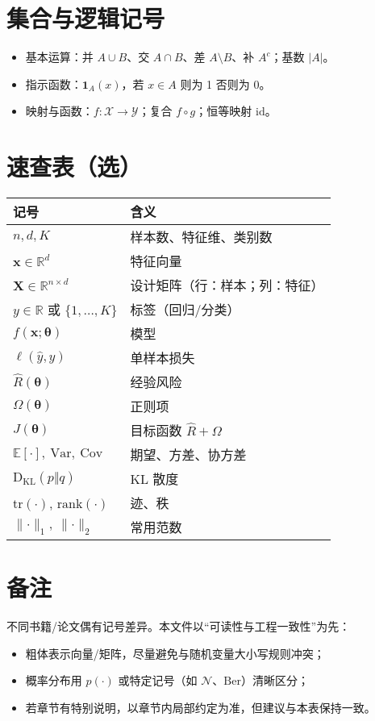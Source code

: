 \documentclass[UTF8,zihao=-4]{ctexart}
\newcommand{\R}{\mathbb{R}}
\newcommand{\E}{\mathbb{E}}
\newcommand{\Var}{\mathrm{Var}}
\newcommand{\Cov}{\mathrm{Cov}}
\newcommand{\KL}{\mathrm{D}_{\mathrm{KL}}}
\newcommand{\tr}{\mathrm{tr}}
\newcommand{\rank}{\mathrm{rank}}
\newcommand{\1}{\mathbf{1}}
\newcommand{\0}{\mathbf{0}}
\begin{document}
\section{集合与逻辑记号}
\begin{itemize}
  \item 基本运算：并 $A\cup B$、交 $A\cap B$、差 $A\setminus B$、补 $A^c$；基数 $|A|$。
  \item 指示函数：$\mathbf{1}_A(x)$，若 $x\in A$ 则为 1 否则为 0。
  \item 映射与函数：$f:\mathcal{X}\to\mathcal{Y}$；复合 $f\circ g$；恒等映射 $\mathrm{id}$。
\end{itemize}

\section{速查表（选）}
\begin{center}
\begin{tabular}{ll}
\hline
记号 & 含义 \\
\hline
$n, d, K$ & 样本数、特征维、类别数 \\
$\bm{x}\in\R^d$ & 特征向量 \\
$\bm{X}\in\R^{n\times d}$ & 设计矩阵（行：样本；列：特征） \\
$y\in\R$ 或 $\{1,\dots,K\}$ & 标签（回归/分类） \\
$f(\bm{x};\bm{\theta})$ & 模型 \\
$\ell(\hat{y},y)$ & 单样本损失 \\
$\hat{R}(\bm{\theta})$ & 经验风险 \\
$\Omega(\bm{\theta})$ & 正则项 \\
$J(\bm{\theta})$ & 目标函数 $\hat{R}+\Omega$ \\
$\E[\cdot],\ \Var,\ \Cov$ & 期望、方差、协方差 \\
$\KL(p\Vert q)$ & KL 散度 \\
$\tr(\cdot)$, $\rank(\cdot)$ & 迹、秩 \\
$\lVert\cdot\rVert_1,\ \lVert\cdot\rVert_2$ & 常用范数 \\
\hline
\end{tabular}
\end{center}

\section{备注}
不同书籍/论文偶有记号差异。本文件以“可读性与工程一致性”为先：
\begin{itemize}
  \item 粗体表示向量/矩阵，尽量避免与随机变量大小写规则冲突；
  \item 概率分布用 $p(\cdot)$ 或特定记号（如 $\mathcal{N}$、$\mathrm{Ber}$）清晰区分；
  \item 若章节有特别说明，以章节内局部约定为准，但建议与本表保持一致。
\end{itemize}
\end{document}
